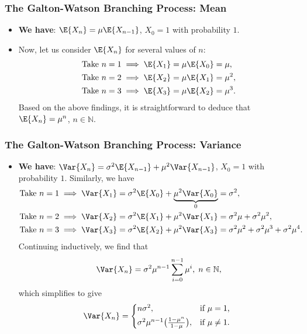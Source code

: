 \subsubsection{The Galton-Watson Branching Process: Mean}
\begin{itemize}
    \item \textbf{We have}: $ \E{X_{n}}=\mu \E{X_{n-1}} $, $ X_0=1 $ with probability $1$.
    \item Now, let us consider $ \E{X_n} $ for several values of $ n $:
          \begin{align*}
               & \text{Take }n=1\implies \E{X_1}=\mu\E{X_0}=\mu,   \\
               & \text{Take }n=2\implies \E{X_2}=\mu\E{X_1}=\mu^2, \\
               & \text{Take }n=3\implies \E{X_3}=\mu\E{X_2}=\mu^3.
          \end{align*}
          Based on the above findings, it is straightforward to deduce that $ \E{X_n}=\mu^n $, $ n\in\mathbb{N} $.
\end{itemize}
\subsubsection{The Galton-Watson Branching Process: Variance}
\begin{itemize}
    \item \textbf{We have}: $ \Var{X_n}=\sigma^2\E{X_{n-1}}+\mu^2\Var{X_{n-1}} $, $ X_0=1 $ with probability $ 1 $.
          Similarly, we have
          \begin{align*}
               & \text{Take }n=1\implies \Var{X_1}=\sigma^2\E{X_0}+\underbrace{\mu^2\Var{X_0}}_{0}=\sigma^2,                 \\
               & \text{Take }n=2\implies \Var{X_2}=\sigma^2\E{X_1}+\mu^2\Var{X_1}=\sigma^2\mu+\sigma^2\mu^2,                 \\
               & \text{Take }n=3\implies \Var{X_3}=\sigma^2\E{X_2}+\mu^2\Var{X_3}=\sigma^2\mu^2+\sigma^2\mu^3+\sigma^2\mu^4.
          \end{align*}
          Continuing inductively, we find that
          \[ \Var{X_n}=\sigma^2\mu^{n-1}\sum_{i=0}^{n-1} \mu^i,\; n\in\mathbb{N}, \]
          which simplifies to give
          \[ \Var{X_n}=\begin{cases*}
                  n\sigma^2,                                           & \text{if $ \mu=1 $},  \\
                  \sigma^2\mu^{n-1}\bigl(\frac{1-\mu^n}{1-\mu} \bigr), & \text{if $\mu\ne 1$}.
              \end{cases*} \]
\end{itemize}
